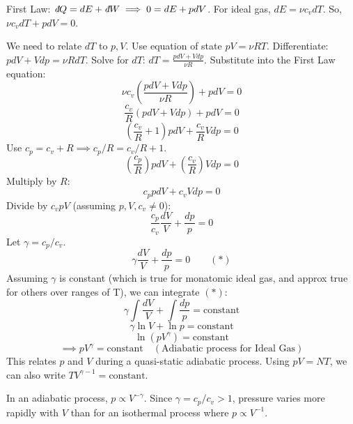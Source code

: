 \documentclass[11pt]{article}
\newcommand{\ethbar}{\text{\it{đ}}} %
\newcommand{\gasR}{R} %
\begin{document}
First Law: $\ethbar Q = dE + \ethbar W \implies 0 = dE + p dV$.
For ideal gas, $dE = \nu c_v dT$.
So, $\nu c_v dT + p dV = 0$.

We need to relate $dT$ to $p, V$. Use equation of state $pV = \nu \gasR T$.
Differentiate: $p dV + V dp = \nu \gasR dT$.
Solve for $dT$: $dT = \frac{p dV + V dp}{\nu \gasR}$.
Substitute into the First Law equation:
\[ \nu c_v \left( \frac{p dV + V dp}{\nu \gasR} \right) + p dV = 0 \]
\[ \frac{c_v}{\gasR} (p dV + V dp) + p dV = 0 \]
\[ \left( \frac{c_v}{\gasR} + 1 \right) p dV + \frac{c_v}{\gasR} V dp = 0 \]
Use $c_p = c_v + \gasR \implies c_p/\gasR = c_v/\gasR + 1$.
\[ \left( \frac{c_p}{\gasR} \right) p dV + \left( \frac{c_v}{\gasR} \right) V dp = 0 \]
Multiply by $\gasR$:
\[ c_p p dV + c_v V dp = 0 \]
Divide by $c_v p V$ (assuming $p, V, c_v \neq 0$):
\[ \frac{c_p}{c_v} \frac{dV}{V} + \frac{dp}{p} = 0 \]
Let $\gamma = c_p / c_v$.
\[ \gamma \frac{dV}{V} + \frac{dp}{p} = 0 \qquad (*) \]
Assuming $\gamma$ is constant (which is true for monatomic ideal gas, and approx true for others over ranges of T), we can integrate $(*)$:
\[ \gamma \int \frac{dV}{V} + \int \frac{dp}{p} = \text{constant} \]
\[ \gamma \ln V + \ln p = \text{constant} \]
\[ \ln(p V^\gamma) = \text{constant} \]
\[ \implies p V^\gamma = \text{constant} \quad (\text{Adiabatic process for Ideal Gas}) \]
This relates $p$ and $V$ during a quasi-static adiabatic process.
Using $pV=NT$, we can also write $T V^{\gamma-1} = \text{constant}$.

In an adiabatic process, $p \propto V^{-\gamma}$. Since $\gamma = c_p/c_v > 1$, pressure varies more rapidly with $V$ than for an isothermal process where $p \propto V^{-1}$.
\end{document}
